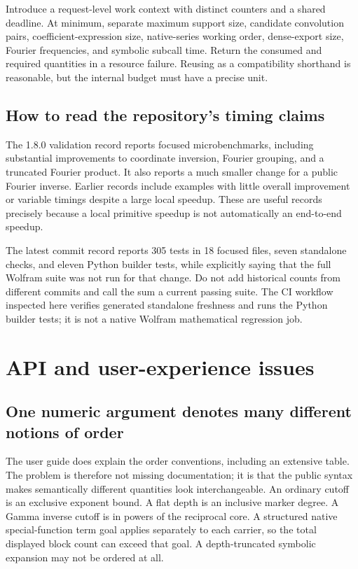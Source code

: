 \documentclass[11pt,letterpaper]{article}
\newcommand{\code}[1]{\texttt{\small\detokenize{#1}}}
\begin{document}
Introduce a request-level work context with distinct counters and a shared deadline. At minimum, separate maximum support size, candidate convolution pairs, coefficient-expression size, native-series working order, dense-export size, Fourier frequencies, and symbolic subcall time. Return the consumed and required quantities in a resource failure. Reusing \code{MaxTerms} as a compatibility shorthand is reasonable, but the internal budget must have a precise unit.

\subsection{How to read the repository's timing claims}
The 1.8.0 validation record reports focused microbenchmarks, including substantial improvements to coordinate inversion, Fourier grouping, and a truncated Fourier product. It also reports a much smaller change for a public Fourier inverse. Earlier records include examples with little overall improvement or variable timings despite a large local speedup. These are useful records precisely because a local primitive speedup is not automatically an end-to-end speedup.\cite{repo-validation}

The latest commit record reports 305 tests in 18 focused files, seven standalone checks, and eleven Python builder tests, while explicitly saying that the full Wolfram suite was not run for that change. Do not add historical counts from different commits and call the sum a current passing suite. The CI workflow inspected here verifies generated standalone freshness and runs the Python builder tests; it is not a native Wolfram mathematical regression job.\cite{repo-validation,repo-ci}

\section{API and user-experience issues}
\label{sec:api}
\subsection{One numeric argument denotes many different notions of order}
The user guide does explain the order conventions, including an extensive table. The problem is therefore not missing documentation; it is that the public syntax makes semantically different quantities look interchangeable. An ordinary cutoff is an exclusive exponent bound. A flat depth is an inclusive marker degree. A Gamma inverse cutoff is in powers of the reciprocal core. A structured native special-function term goal applies separately to each carrier, so the total displayed block count can exceed that goal. A depth-truncated symbolic expansion may not be ordered at all.\cite{repo-guide}
\end{document}

